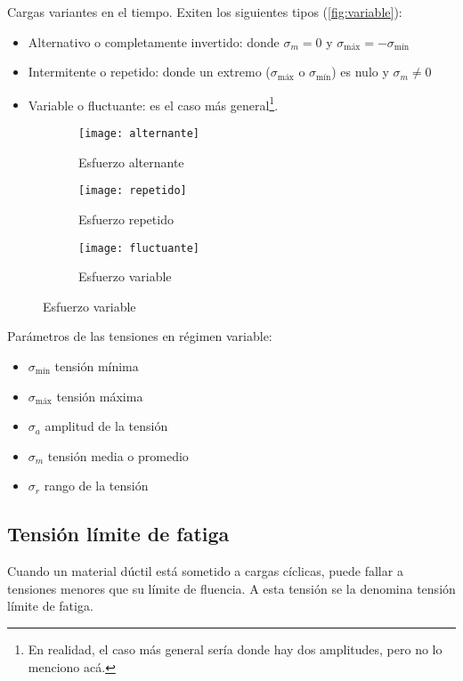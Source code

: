 \documentclass[spanish,11pt,a4paper]{article}
\begin{document}
	Cargas variantes en el tiempo. Exiten los siguientes tipos (\autoref{fig:variable}):
	\begin{itemize}
		\item Alternativo o completamente invertido: donde $\sigma_m = 0$ y $\sigma_\text{máx} = - \sigma_\text{mín}$
		\item Intermitente o repetido: donde un extremo ($\sigma_\text{máx}$ o $\sigma_\text{mín}$) es nulo y $\sigma_m \neq 0$
		\item Variable o fluctuante: es el caso más general\footnote{En realidad, el caso más general sería donde hay dos amplitudes, pero no lo menciono acá.}.
	\end{itemize}
	\begin{figure}[h]
		\centering\caption{Algunas relaciones esfuerzo-tiempo.}\label{fig:variable}
		\begin{subfigure}{.44\linewidth}
		\texttt{[image: alternante]}\caption{Esfuerzo alternante}
		\end{subfigure}
		\begin{subfigure}{.44\linewidth}
		\texttt{[image: repetido]}\caption{Esfuerzo repetido}
		\end{subfigure}
		
		\begin{subfigure}{.3\linewidth}
		\texttt{[image: fluctuante]}\caption{Esfuerzo variable}
		\end{subfigure}
	\end{figure}
	Parámetros de las tensiones en régimen variable:
	\begin{itemize}
		\item $\sigma_\text{mín}$ tensión mínima
		\item $\sigma_\text{máx}$ tensión máxima
		\item $\sigma_a$ amplitud de la tensión
		\item $\sigma_m$ tensión media o promedio
		\item $\sigma_r$ rango de la tensión
	\end{itemize}
	
	\subsection{Tensión límite de fatiga}
	
	Cuando un material dúctil está sometido a cargas cíclicas, puede fallar a tensiones menores que su límite de fluencia. A esta tensión se la denomina tensión límite de fatiga.
	
\end{document}
